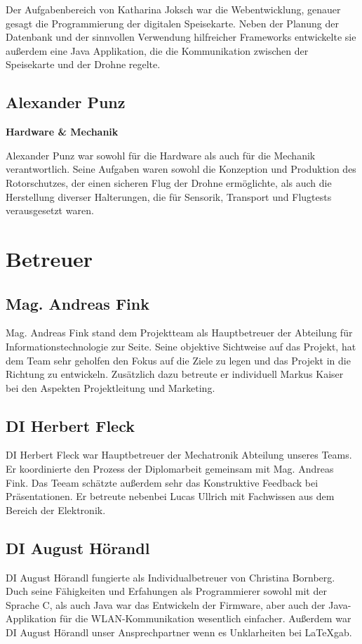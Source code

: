   Der Aufgabenbereich von Katharina Joksch war die Webentwicklung, genauer gesagt die Programmierung der digitalen Speisekarte.
  Neben der Planung der Datenbank und der sinnvollen Verwendung hilfreicher Frameworks entwickelte sie außerdem eine Java Applikation,
  die die Kommunikation zwischen der Speisekarte und der Drohne regelte.

  \subsection*{Alexander Punz}
  \textbf{Hardware \& Mechanik}

  Alexander Punz war sowohl für die Hardware als auch für die Mechanik verantwortlich. Seine Aufgaben waren sowohl die Konzeption
  und Produktion des Rotorschutzes, der einen sicheren Flug der Drohne ermöglichte, als auch die Herstellung diverser Halterungen,
  die für Sensorik, Transport und Flugtests verausgesetzt waren.

\section{Betreuer}
  \subsection*{Mag. Andreas Fink}
  Mag. Andreas Fink stand dem Projektteam als Hauptbetreuer der Abteilung für Informationstechnologie zur Seite.
  Seine objektive Sichtweise auf das Projekt, hat dem Team sehr geholfen den Fokus auf die Ziele zu legen und
  das Projekt in die Richtung zu entwickeln.
  Zusätzlich dazu betreute er individuell Markus Kaiser bei den Aspekten Projektleitung und Marketing.

  \subsection*{DI Herbert Fleck}
  DI Herbert Fleck war Hauptbetreuer der Mechatronik Abteilung unseres Teams. Er koordinierte den Prozess der Diplomarbeit
  gemeinsam mit Mag. Andreas Fink. Das Teeam schätzte außerdem sehr das Konstruktive Feedback bei Präsentationen.
  Er betreute nebenbei Lucas Ullrich mit Fachwissen aus dem Bereich der Elektronik.

  \subsection*{DI August Hörandl}
  DI August Hörandl fungierte als Individualbetreuer von Christina Bornberg. Duch seine Fähigkeiten und
  Erfahungen als Programmierer sowohl mit der Sprache C, als auch Java war das Entwickeln der Firmware,
  aber auch der Java-Applikation für die WLAN-Kommunikation wesentlich einfacher. Außerdem war
  DI August Hörandl unser Ansprechpartner wenn es Unklarheiten bei \LaTeX gab.

